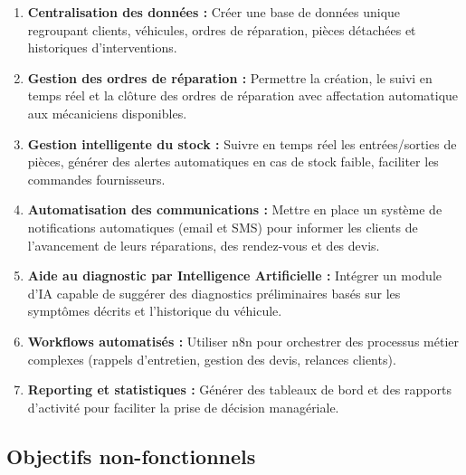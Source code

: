 \begin{enumerate}
    \item \textbf{Centralisation des données :} Créer une base de données unique regroupant clients, véhicules, ordres de réparation, pièces détachées et historiques d'interventions.
    
    \item \textbf{Gestion des ordres de réparation :} Permettre la création, le suivi en temps réel et la clôture des ordres de réparation avec affectation automatique aux mécaniciens disponibles.
    
    \item \textbf{Gestion intelligente du stock :} Suivre en temps réel les entrées/sorties de pièces, générer des alertes automatiques en cas de stock faible, faciliter les commandes fournisseurs.
    
    \item \textbf{Automatisation des communications :} Mettre en place un système de notifications automatiques (email et SMS) pour informer les clients de l'avancement de leurs réparations, des rendez-vous et des devis.
    
    \item \textbf{Aide au diagnostic par Intelligence Artificielle :} Intégrer un module d'IA capable de suggérer des diagnostics préliminaires basés sur les symptômes décrits et l'historique du véhicule.
    
    \item \textbf{Workflows automatisés :} Utiliser n8n pour orchestrer des processus métier complexes (rappels d'entretien, gestion des devis, relances clients).
    
    \item \textbf{Reporting et statistiques :} Générer des tableaux de bord et des rapports d'activité pour faciliter la prise de décision managériale.
\end{enumerate}

\subsection*{Objectifs non-fonctionnels}

